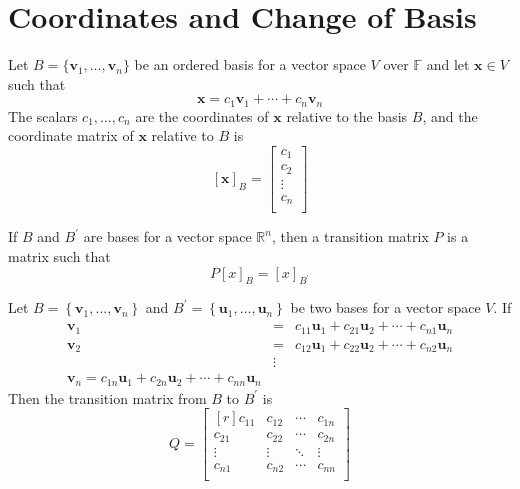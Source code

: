 \section{Coordinates and Change of Basis}
\begin{definition}
    Let \(B=\{ \mathbf{v}_1,\ldots,\mathbf{v}_n \} \) be an ordered basis for a vector space \(V\) over \(\mathbb{F} \) and let \(\mathbf{x}\in V\) such that 
    \[
        \mathbf{x}=c_1 \mathbf{v}_1 + \cdots + c_n \mathbf{v}_n
    \]
    The scalars \(c_1,\ldots,c_n\) are the coordinates of \(\mathbf{x}\) relative to the basis \(B\), and the coordinate matrix of \(\mathbf{x}\) relative to \(B\) is 
    \[
        [\mathbf{x}]_B = \begin{bmatrix}
             c_1 \\
              c_2\\
              \vdots\\
              c_n\\
        \end{bmatrix}
    \]
\end{definition}
\begin{definition}
    If \(B\) and \(B^{\prime} \) are bases for a vector space \(\mathbb{R}^n\), then a transition matrix \(P\) is a matrix such that
    \[
        P[x]_B = [x]_{B^{\prime} }
    \]
\end{definition}
\begin{lemma}
    Let \(B=\left\{ \mathbf{v}_1,\ldots,\mathbf{v}_n \right\} \) and \(B^{\prime} =\left\{ \mathbf{u}_1,\ldots,\mathbf{u}_n \right\} \) be two bases for a vector space \(V\). If
    \[
        \begin{array}{ccc}
            \mathbf{v}_1&=&c_{11}\mathbf{u}_1 + c_{21}\mathbf{u}_2 + \cdots+c_{n1}\mathbf{u}_n\\
            \mathbf{v}_2&=&c_{12}\mathbf{u}_1 +c_{22}\mathbf{u}_2+\cdots +c_{n2} \mathbf{u}_n \\
            &\vdots&\\
            \mathbf{v}_n = c_{1n}\mathbf{u}_1 + c_{2n}\mathbf{u}_2  + \cdots +c_{nn}\mathbf{u}_n 
        \end{array}
    \]
    Then the transition matrix from \(B\) to \(B^{\prime} \) is
    \[
        Q=\begin{bmatrix}[r]
            c_{11}  &c_{12}   &\cdots  &c_{1n}    \\
             c_{21} &c_{22}   &\cdots  &   c_{2n} \\
             \vdots&\vdots  &\ddots  &\vdots   \\
             c_{n1} &c_{n2}   &\cdots  &c_{nn}    \\
        \end{bmatrix}
    \]
\end{lemma}
